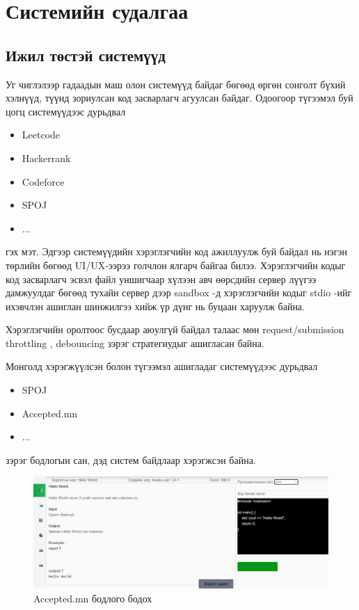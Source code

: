 \chapter{Системийн судалгаа}
\section{Ижил төстэй системүүд}
Уг чиглэлээр гадаадын маш олон системүүд байдаг бөгөөд өргөн сонголт бүхий хэлнүүд, түүнд зориулсан код засварлагч агуулсан байдаг. Одоогоор түгээмэл буй цогц системүүдээс дурьдвал 
\begin{itemize}
  \item Leetcode
  \item Hackerrank
  \item Codeforce
  \item SPOJ
  \item ...
\end{itemize} 
гэх мэт. Эдгээр системүүдийн хэрэглэгчийн код ажиллуулж буй байдал нь нэгэн төрлийн бөгөөд UI/UX-ээрээ голчлон ялгарч байгаа билээ. Хэрэглэгчийн кодыг код засварлагч эсвэл файл уншигчаар хүлээн авч өөрсдийн сервер лүүгээ дамжуулдаг бөгөөд тухайн сервер дээр sandbox\footnotemark{} -д хэрэглэгчийн кодыг stdio\footnotemark{} -ийг ихэвчлэн ашиглан шинжилгээ хийж үр дүнг нь буцаан харуулж байна. 

Хэрэглэгчийн оролтоос бусдаар аюулгүй байдал талаас мөн request/submission throttling\footnotemark{} , debouncing\footnotemark{}  зэрэг стратегиудыг ашигласан байна.  

\clearpage

Монголд хэрэгжүүлсэн болон түгээмэл ашигладаг системүүдээс дурьдвал
\begin{itemize}
  \item SPOJ
  \item Accepted.mn
  \item ...
\end{itemize} зэрэг бодлогын сан, дэд систем байдлаар хэрэгжсэн байна. 

\begin{figure}[h]
  \centering
  \includegraphics[width=15cm]{img/accepted.PNG}
  \caption{Accepted.mn бодлого бодох}
\end{figure}

